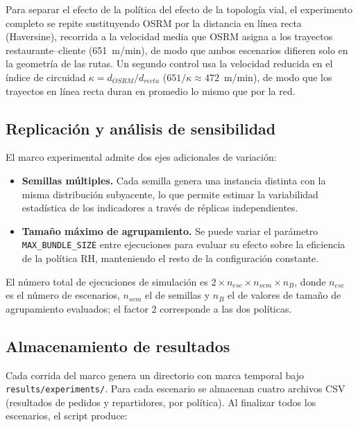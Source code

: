 \documentclass[12pt,letterpaper,oneside]{book}
\begin{document}
	Para separar el efecto de la política del efecto de la topología vial, el experimento
	completo se repite sustituyendo OSRM por la distancia en línea recta (Haversine), recorrida
	a la velocidad media que OSRM asigna a los trayectos restaurante--cliente (651~m/min), de modo
	que ambos escenarios difieren solo en la geometría de las rutas.  Un segundo control usa la
	velocidad reducida en el índice de circuidad $\kappa = d_{OSRM} / d_{recta}$
	($651/\kappa \approx 472$~m/min), de modo que los trayectos en línea recta duran en promedio
	lo mismo que por la red.

	\subsection{Replicación y análisis de sensibilidad}

	El marco experimental admite dos ejes adicionales de variación:

	\begin{itemize}
		\item \textbf{Semillas múltiples.}  Cada semilla genera una instancia distinta
		      con la misma distribución subyacente, lo que permite estimar la
		      variabilidad estadística de los indicadores a través de réplicas
		      independientes.
		\item \textbf{Tamaño máximo de agrupamiento.}  Se puede variar el parámetro
		      \texttt{MAX\_BUNDLE\_SIZE} entre ejecuciones para evaluar su efecto
		      sobre la eficiencia de la política RH, manteniendo el resto de la
		      configuración constante.
	\end{itemize}

	El número total de ejecuciones de simulación es
	$2 \times n_{esc} \times n_{sem} \times n_{B}$, donde $n_{esc}$ es el número de
	escenarios, $n_{sem}$ el de semillas y $n_{B}$ el de valores de tamaño de
	agrupamiento evaluados; el factor 2 corresponde a las dos políticas.

	\subsection{Almacenamiento de resultados}

	Cada corrida del marco genera un directorio con marca temporal bajo
	\texttt{results/experiments/}.  Para cada escenario se almacenan cuatro archivos
	CSV (resultados de pedidos y repartidores, por política).  Al finalizar todos los
	escenarios, el script produce:
\end{document}
